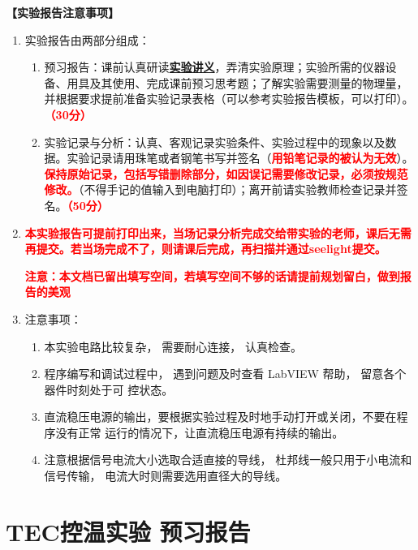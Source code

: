 \documentclass[dvipsnames, svgnames,a4paper,11pt]{article}
\begin{document}
	\textbf{【实验报告注意事项】}
	\begin{enumerate}[label=\arabic*., leftmargin=*]
		\item 实验报告由两部分组成：
			\begin{enumerate}[label=\arabic*), leftmargin=*]
				\item 预习报告：课前认真研读\underline{\textbf{实验讲义}}，弄清实验原理；实验所需的仪器设备、用具及其使用、完成课前预习思考题；了解实验需要测量的物理量，并根据要求提前准备实验记录表格（可以参考实验报告模板，可以打印）。\textcolor{red}{\textbf{（30分）}}
				\item 实验记录与分析：认真、客观记录实验条件、实验过程中的现象以及数据。实验记录请用珠笔或者钢笔书写并签名（\textcolor{red}{\textbf{用铅笔记录的被认为无效}}）。\textcolor{red}{\textbf{保持原始记录，包括写错删除部分，如因误记需要修改记录，必须按规范修改。}}（不得手记的值输入到电脑打印）；离开前请实验教师检查记录并签名。\textcolor{red}{\textbf{（50分）}}
			\end{enumerate}
		
		\item \textcolor{red}{\textbf{本实验报告可提前打印出来，当场记录分析完成交给带实验的老师，课后无需再提交。若当场完成不了，则请课后完成，再扫描并通过seelight提交。}}
		
		\textcolor{red}{\textbf{注意：本文档已留出填写空间，若填写空间不够的话请提前规划留白，做到报告的美观}}
		\item 注意事项：
			\begin{enumerate}[label=\arabic*), leftmargin=*]
				\item 本实验电路比较复杂， 需要耐心连接， 认真检查。
				\item 程序编写和调试过程中， 遇到问题及时查看 LabVIEW 帮助， 留意各个器件时刻处于可
				控状态。
				\item 直流稳压电源的输出，要根据实验过程及时地手动打开或关闭，不要在程序没有正常
				运行的情况下，让直流稳压电源有持续的输出。
				\item 注意根据信号电流大小选取合适直接的导线， 杜邦线一般只用于小电流和信号传输，
				电流大时则需要选用直径大的导线。
			\end{enumerate}
	\end{enumerate}
	
	
	\clearpage
	\tableofcontents
	\clearpage
	
	\setcounter{section}{0}
	\section{TEC控温实验 \quad\heiti 预习报告}
		
\end{document}
